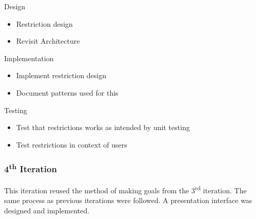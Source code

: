 Design
\begin{itemize}
  \item Restriction design
  \item Revisit Architecture
\end{itemize}

Implementation
\begin{itemize}
  \item Implement restriction design
  \item Document patterns used for this
\end{itemize}

Testing
\begin{itemize}
  \item Test that restrictions works as intended by unit testing
  \item Test restrictions in context of users
\end{itemize}

\subsubsection{4\textsuperscript{th} Iteration}

This iteration reused the method of making goals from the
3\textsuperscript{rd} iteration.  The same process as previous
iterations were followed. A presentation interface was designed and implemented.